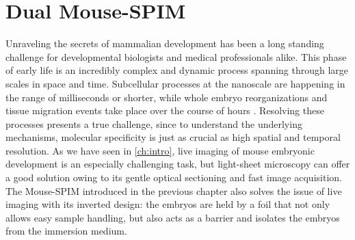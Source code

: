 

\chapter{Dual Mouse-SPIM}

\graphicspath{{./figures/2_DualMouse/}}

\label{ch:DualMouse}




Unraveling the secrets of mammalian development has been a long standing challenge for developmental biologists and medical professionals alike. 
This phase of early life is an incredibly complex and dynamic process spanning through large scales in space and time. Subcellular processes at the nanoscale are happening in the range of milliseconds or shorter, while whole embryo reorganizations and tissue migration events take place over the course of hours \cite{gilbert_developmental_2013}. Resolving these processes presents a true challenge, since to understand the underlying mechanisms, molecular specificity is just as crucial as high spatial and temporal resolution.
As we have seen in \autoref{ch:intro}, live imaging of mouse embryonic development is an especially challenging task, but light-sheet microscopy can offer a good solution owing to its gentle optical sectioning and fast image acquisition. The Mouse-SPIM \cite{strnad_inverted_2016} introduced in the previous chapter also solves the issue of live imaging with its inverted design: the embryos are held by a foil that not only allows easy sample handling, but also acts as a barrier and isolates the embryos from the immersion medium.

